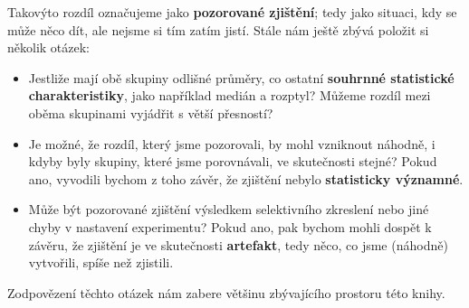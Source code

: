 \documentclass[12pt]{book}
\begin{document}
Takovýto rozdíl označujeme jako {\bf pozorované zjištění}; tedy jako situaci, kdy se může něco dít, ale nejsme si tím zatím jistí. Stále nám ještě zbývá položit si několik otázek:

\begin{itemize}

\item Jestliže mají obě skupiny odlišné průměry, co ostatní {\bf
 souhrnné statistické charakteristiky}, jako například medián a rozptyl?  Můžeme rozdíl mezi oběma skupinami vyjádřit s větší přesností?

\item Je možné, že rozdíl, který jsme pozorovali, by mohl vzniknout náhodně, i kdyby byly skupiny, které jsme porovnávali, ve skutečnosti stejné? Pokud ano, vyvodili bychom z toho závěr, že zjištění nebylo {\bf statisticky významné}.


\item Může být pozorované zjištění výsledkem selektivního zkreslení nebo jiné chyby v nastavení experimentu? Pokud ano, pak bychom mohli dospět k závěru, že zjištění je ve skutečnosti {\bf artefakt}, tedy něco, co jsme (náhodně) vytvořili, spíše než zjistili.

\end{itemize}

Zodpovězení těchto otázek nám zabere většinu zbývajícího prostoru této knihy.
\end{document}
